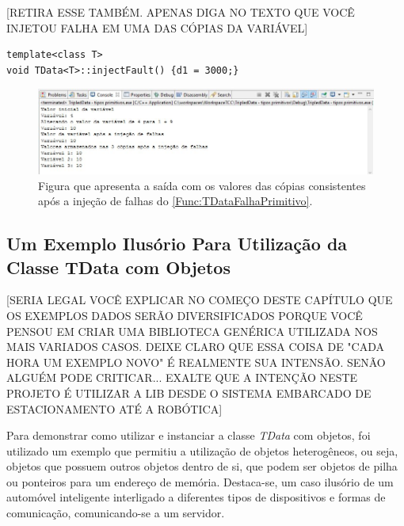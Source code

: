 [RETIRA ESSE TAMBÉM. APENAS DIGA NO TEXTO QUE VOCÊ INJETOU FALHA EM UMA DAS CÓPIAS DA VARIÁVEL]

\begin{lstlisting}[label=Func:TDataFalhaPrimitivo,caption={[Método utilizado para injeção de falhas em uma das cópias da classe TData.] Este método pode ser implementado dentro da classe TData para simular um bit-flip.}]
template<class T>
void TData<T>::injectFault() {d1 = 3000;}
\end{lstlisting}

\begin{figure}[H]
	\centering
	\includegraphics[width=1.0\textwidth]{figuras/tdataPrimitivo.jpg}
	\caption[Figura que apresenta a saída com os valores das cópias consistentes após a injeção de falhas do \autoref{Func:TDataFalhaPrimitivo}.]{Figura que apresenta a saída com os valores das cópias consistentes após a injeção de falhas do \autoref{Func:TDataFalhaPrimitivo}.}
	\label{Img:tdataPrimitivo}	
\end{figure}	


\subsection{Um Exemplo Ilusório Para Utilização da Classe TData com Objetos} \label{subsec:exemploTData}

[SERIA LEGAL VOCÊ EXPLICAR NO COMEÇO DESTE CAPÍTULO QUE OS EXEMPLOS DADOS SERÃO DIVERSIFICADOS PORQUE VOCÊ PENSOU EM CRIAR UMA BIBLIOTECA GENÉRICA UTILIZADA NOS MAIS VARIADOS CASOS. DEIXE CLARO QUE ESSA COISA DE "CADA HORA UM EXEMPLO NOVO" É REALMENTE SUA INTENSÃO. SENÃO ALGUÉM PODE CRITICAR... EXALTE QUE A INTENÇÃO NESTE PROJETO É UTILIZAR A LIB DESDE O SISTEMA EMBARCADO DE ESTACIONAMENTO ATÉ A ROBÓTICA]

Para demonstrar como utilizar e instanciar a classe \textit{TData} com objetos, foi utilizado um exemplo que permitiu a utilização de objetos heterogêneos, ou seja, objetos que possuem outros objetos dentro de si, que podem ser objetos de pilha ou ponteiros para um endereço de memória. Destaca-se, um caso ilusório de um automóvel inteligente interligado a diferentes tipos de dispositivos e formas de comunicação, comunicando-se a um servidor. 

